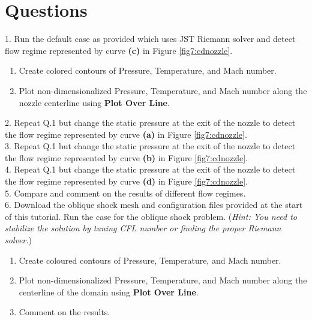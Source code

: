 \section*{Questions}
1. Run the default case as provided which uses JST Riemann solver and detect flow regime represented by curve \textbf{(c)} in Figure \ref{fig7:cdnozzle}.
\begin{enumerate}[label=(\alph*)]
	\item Create colored contours of Pressure, Temperature, and Mach number.
	\item Plot non-dimensionalized Pressure, Temperature, and Mach number along the nozzle centerline using \textbf{Plot Over Line}.
\end{enumerate}
2. Repeat Q.1 but change the static pressure at the exit of the nozzle to detect the flow regime represented by curve \textbf{(a)} in Figure \ref{fig7:cdnozzle}.\\
3. Repeat Q.1 but change the static pressure at the exit of the nozzle to detect the flow regime represented by curve \textbf{(b)} in Figure \ref{fig7:cdnozzle}.\\
4. Repeat Q.1 but change the static pressure at the exit of the nozzle to detect the flow regime represented by curve \textbf{(d)} in Figure \ref{fig7:cdnozzle}.\\
5. Compare and comment on the results of different flow regimes.\\
6. Download the oblique shock mesh and configuration files provided at the start of this tutorial. Run the case for the oblique shock problem.
(\textit{Hint: You need to stabilize the solution by tuning CFL number or finding the proper Riemann solver.})
\begin{enumerate}[label=(\alph*)]
	\item Create coloured contours of Pressure, Temperature, and Mach number.
	\item Plot non-dimensionalized Pressure, Temperature, and Mach number along the centerline of the domain using \textbf{Plot Over Line}.
	\item Comment on the results.
\end{enumerate}


